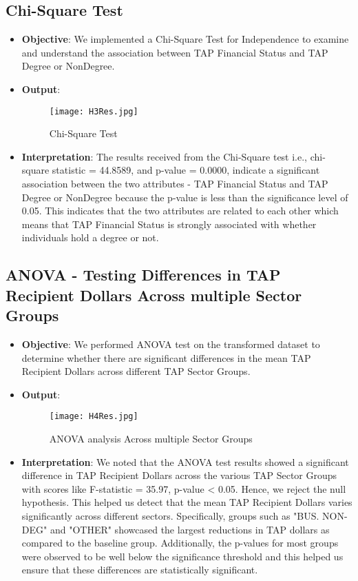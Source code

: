 \documentclass[sigconf]{acmart}
\begin{document}
\subsection{Chi-Square Test}
\begin{itemize}
    \item \textbf{Objective}: We implemented a Chi-Square Test for Independence to examine and understand the association between TAP Financial Status and TAP Degree or NonDegree.
    \item \textbf{Output}:
    \begin{figure}[h] 
    \centering
    \texttt{[image: H3Res.jpg]} 
    \caption{Chi-Square Test } 
    \label{fig:data_testing} 
    \end{figure}
    \item \textbf{Interpretation}: The results received from the Chi-Square test i.e., chi-square statistic = 44.8589, and p-value = 0.0000,  indicate a significant association between the two attributes - TAP Financial Status and TAP Degree or NonDegree because the p-value is less than the significance level of 0.05. This indicates that the two attributes are related to each other which means that TAP Financial Status is strongly associated with whether individuals hold a degree or not.
\end{itemize}

\subsection{ANOVA - Testing Differences in TAP Recipient Dollars Across multiple Sector Groups}
\begin{itemize}
    \item \textbf{Objective}: We performed ANOVA test on the transformed dataset to determine whether there are significant differences in the mean TAP Recipient Dollars across different TAP Sector Groups.
    \item \textbf{Output}:
    \begin{figure}[h] 
    \centering
    \texttt{[image: H4Res.jpg]} 
    \caption{ANOVA analysis Across multiple Sector Groups} 
    \label{fig:data_testing} 
    \end{figure}
    \item \textbf{Interpretation}: We noted that the ANOVA test results showed a significant difference in TAP Recipient Dollars across the various TAP Sector Groups with scores like F-statistic = 35.97, p-value < 0.05. Hence, we reject the null hypothesis. This helped us detect that the mean TAP Recipient Dollars varies significantly across different sectors. Specifically, groups such as "BUS. NON-DEG" and "OTHER" showcased the largest reductions in TAP dollars as compared to the baseline group. Additionally, the p-values for most groups were observed to be well below the significance threshold and this helped us ensure that these differences are statistically significant.
\end{itemize}
\end{document}

